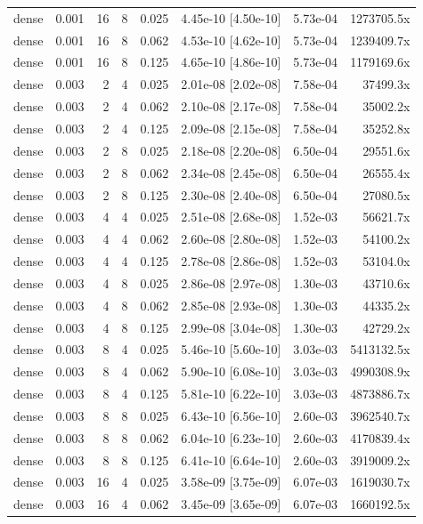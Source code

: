 \begin{tabular}{lrrrrrrr}
dense & 0.001 & 16 & 8 & 0.025 & 4.45e-10 [4.50e-10] & 5.73e-04 & 1273705.5x \\
dense & 0.001 & 16 & 8 & 0.062 & 4.53e-10 [4.62e-10] & 5.73e-04 & 1239409.7x \\
dense & 0.001 & 16 & 8 & 0.125 & 4.65e-10 [4.86e-10] & 5.73e-04 & 1179169.6x \\
dense & 0.003 & 2 & 4 & 0.025 & 2.01e-08 [2.02e-08] & 7.58e-04 & 37499.3x \\
dense & 0.003 & 2 & 4 & 0.062 & 2.10e-08 [2.17e-08] & 7.58e-04 & 35002.2x \\
dense & 0.003 & 2 & 4 & 0.125 & 2.09e-08 [2.15e-08] & 7.58e-04 & 35252.8x \\
dense & 0.003 & 2 & 8 & 0.025 & 2.18e-08 [2.20e-08] & 6.50e-04 & 29551.6x \\
dense & 0.003 & 2 & 8 & 0.062 & 2.34e-08 [2.45e-08] & 6.50e-04 & 26555.4x \\
dense & 0.003 & 2 & 8 & 0.125 & 2.30e-08 [2.40e-08] & 6.50e-04 & 27080.5x \\
dense & 0.003 & 4 & 4 & 0.025 & 2.51e-08 [2.68e-08] & 1.52e-03 & 56621.7x \\
dense & 0.003 & 4 & 4 & 0.062 & 2.60e-08 [2.80e-08] & 1.52e-03 & 54100.2x \\
dense & 0.003 & 4 & 4 & 0.125 & 2.78e-08 [2.86e-08] & 1.52e-03 & 53104.0x \\
dense & 0.003 & 4 & 8 & 0.025 & 2.86e-08 [2.97e-08] & 1.30e-03 & 43710.6x \\
dense & 0.003 & 4 & 8 & 0.062 & 2.85e-08 [2.93e-08] & 1.30e-03 & 44335.2x \\
dense & 0.003 & 4 & 8 & 0.125 & 2.99e-08 [3.04e-08] & 1.30e-03 & 42729.2x \\
dense & 0.003 & 8 & 4 & 0.025 & 5.46e-10 [5.60e-10] & 3.03e-03 & 5413132.5x \\
dense & 0.003 & 8 & 4 & 0.062 & 5.90e-10 [6.08e-10] & 3.03e-03 & 4990308.9x \\
dense & 0.003 & 8 & 4 & 0.125 & 5.81e-10 [6.22e-10] & 3.03e-03 & 4873886.7x \\
dense & 0.003 & 8 & 8 & 0.025 & 6.43e-10 [6.56e-10] & 2.60e-03 & 3962540.7x \\
dense & 0.003 & 8 & 8 & 0.062 & 6.04e-10 [6.23e-10] & 2.60e-03 & 4170839.4x \\
dense & 0.003 & 8 & 8 & 0.125 & 6.41e-10 [6.64e-10] & 2.60e-03 & 3919009.2x \\
dense & 0.003 & 16 & 4 & 0.025 & 3.58e-09 [3.75e-09] & 6.07e-03 & 1619030.7x \\
dense & 0.003 & 16 & 4 & 0.062 & 3.45e-09 [3.65e-09] & 6.07e-03 & 1660192.5x \\

\end{tabular}
